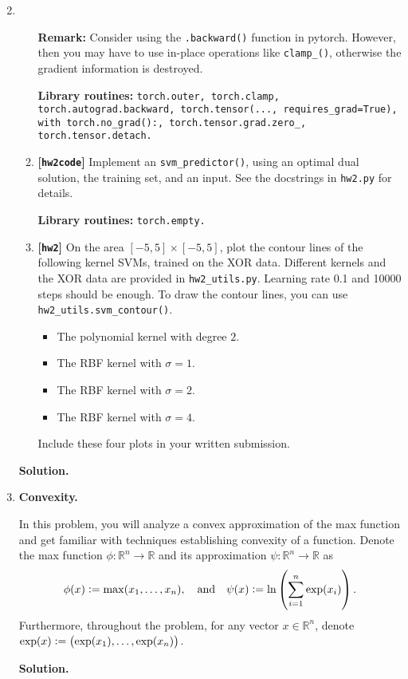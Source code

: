 \documentclass{article}
\def\R{\mathbb{R}}
\def\hw{\textbf{[\texttt{hw2}]}\xspace}
\def\hwcode{\textbf{[\texttt{hw2code}]}\xspace}
\newcommand{\tildephi}{\psi}
\theoremstyle{definition}
\theoremstyle{remark}
\newenvironment{Q}
{%
\clearpage
\item
}
{%
\phantom{s}%
\bigskip%
\noindent\textbf{Solution.}
}
\begin{document}
\begin{enumerate}[font={\Large\bfseries},leftmargin=0pt]
\begin{Q}
\begin{enumerate}
    \textbf{Remark:} Consider using the \texttt{.backward()} function in pytorch. 
    However, then you may have to use in-place operations like \texttt{clamp\_()}, otherwise the gradient information is destroyed.
    
    \textbf{Library routines:} \texttt{torch.outer, torch.clamp, torch.autograd.backward, torch.tensor(..., requires\_grad=True), with torch.no\_grad():, torch.tensor.grad.zero\_, torch.tensor.detach.}

        \item \hwcode Implement an \texttt{svm\_predictor()}, using an optimal dual solution, the training set, and an input. See the docstrings in \texttt{hw2.py} for details.
        
        \textbf{Library routines:} \texttt{torch.empty.}

        \item \hw On the area $[-5,5]\times[-5,5]$, plot the contour lines of the following kernel SVMs, trained on the XOR data. Different kernels and the XOR data are provided in \texttt{hw2\_utils.py}.
        Learning rate 0.1 and 10000 steps should be enough. To draw the contour lines, you can use \texttt{hw2\_utils.svm\_contour()}.
        \begin{itemize}
            \item The polynomial kernel with degree $2$.
            \item The RBF kernel with $\sigma=1$.
            \item The RBF kernel with $\sigma=2$.
            \item The RBF kernel with $\sigma=4$.
        \end{itemize}
        Include these four plots in your written submission.
    \end{enumerate}
\end{Q}
    


\clearpage



\begin{Q}
  \textbf{\Large Convexity. }

  In this problem, you will analyze a convex 
  approximation of the max function and get familiar with 
  techniques establishing convexity of a function. Denote the max function $\phi : \R^n \rightarrow \R$ 
  and its approximation $\tildephi : \R^n \rightarrow \R$ as
  \[
    \phi(x) := \max( x_1, \dots , x_n), \quad \textrm{and} \quad 
    \tildephi(x) := \ln \del{ \sum_{i = 1}^n \exp(x_i)}.
  \]   
  Furthermore, throughout the problem, for any vector $x \in \R^n$,
  denote $\exp(x) := \del{ \exp(x_1), \dots, \exp(x_n) }$.




\end{Q}
\end{enumerate}
\end{document}
